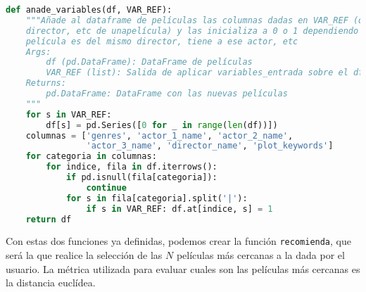 \begin{lstlisting}[language=Python, caption= {Creación de la matriz de coordenadas de las películas. Para ello, se hace uso de la función definida en el \autoref{lst:variablesfila}. Además, se añaden los valores de los géneros de la película.}]
def anade_variables(df, VAR_REF):
    """Añade al dataframe de películas las columnas dadas en VAR_REF (que serán el 
    director, etc de unapelícula) y las inicializa a 0 o 1 dependiendo de si la 
    película es del mismo director, tiene a ese actor, etc
    Args:
        df (pd.DataFrame): DataFrame de películas
        VAR_REF (list): Salida de aplicar variables_entrada sobre el df y una película
    Returns:
        pd.DataFrame: DataFrame con las nuevas películas
    """
    for s in VAR_REF: 
        df[s] = pd.Series([0 for _ in range(len(df))])
    columnas = ['genres', 'actor_1_name', 'actor_2_name',
                'actor_3_name', 'director_name', 'plot_keywords']
    for categoria in columnas:
        for indice, fila in df.iterrows():
            if pd.isnull(fila[categoria]):
                continue
            for s in fila[categoria].split('|'):
                if s in VAR_REF: df.at[indice, s] = 1            
    return df
\end{lstlisting}

Con estas dos funciones ya definidas, podemos crear la función \texttt{recomienda}, que será la que realice la selección de las $N$ películas más cercanas a la dada por el usuario. La métrica utilizada para evaluar cuales son las películas más cercanas es la distancia euclídea.

